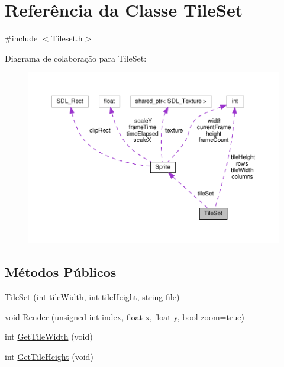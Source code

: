 \hypertarget{classTileSet}{\section{Referência da Classe Tile\+Set}
\label{classTileSet}
}


{\ttfamily \#include $<$Tileset.\+h$>$}



Diagrama de colaboração para Tile\+Set\+:\nopagebreak
\begin{figure}[H]
\begin{center}
\leavevmode
\includegraphics[width=350pt]{classTileSet__coll__graph}
\end{center}
\end{figure}
\subsection*{Métodos Públicos}
\begin{DoxyCompactItemize}
\item 
\hyperlink{classTileSet_a671a1040ef1ba7600a6ea21faa950819}{Tile\+Set} (int \hyperlink{classTileSet_a9ba9087a6da877f78af6cdf9afb0af7c}{tile\+Width}, int \hyperlink{classTileSet_a9409211e1c5560f969b737714be977c0}{tile\+Height}, string file)
\item 
void \hyperlink{classTileSet_a110acfa6e07aa9e5af1798065f23b0f1}{Render} (unsigned int index, float x, float y, bool zoom=true)
\item 
int \hyperlink{classTileSet_a4114a74c06ab5241d904cce67538ae17}{Get\+Tile\+Width} (void)
\item 
int \hyperlink{classTileSet_a965e951eb3ccfd6e318b27c710d973a0}{Get\+Tile\+Height} (void)
\end{DoxyCompactItemize}

